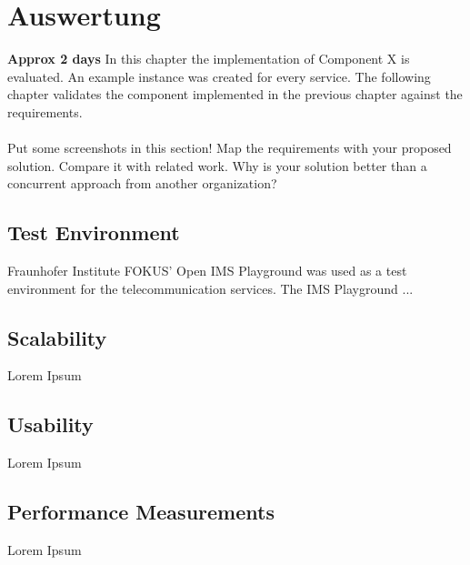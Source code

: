 \chapter{Auswertung\label{cha:chapter6}}


\textbf{Approx 2 days}
In this chapter the implementation of Component X is evaluated. An example instance was created for every service. The following chapter validates the component implemented in the previous chapter against the requirements.
\\
\\
Put some screenshots in this section! Map the requirements with your proposed solution. Compare it with related work. Why is your solution better than a concurrent approach from another organization?

\section{Test Environment\label{sec:testenvir}}

Fraunhofer Institute FOKUS' Open IMS Playground was used as a test environment for the telecommunication services. The IMS Playground ...

\section{Scalability\label{sec:scal}}

Lorem Ipsum

\section{Usability\label{sec:usab}}

Lorem Ipsum

\section{Performance Measurements\label{sec:performance}}

Lorem Ipsum